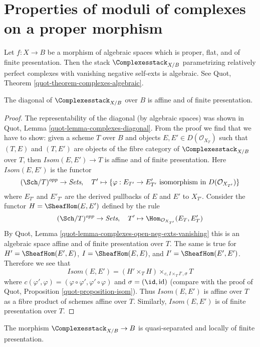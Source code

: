 \section{Properties of moduli of complexes on a proper morphism}
\label{section-complexes}

\noindent
Let $f : X \to B$ be a morphism of algebraic spaces which is proper,
flat, and of finite presentation. Then the stack
$\Complexesstack_{X/B}$ parametrizing relatively perfect complexes
with vanishing negative self-exts is algebraic. See
Quot, Theorem \ref{quot-theorem-complexes-algebraic}.

\begin{lemma}
\label{lemma-complexes-diagonal-affine-fp}
The diagonal of $\Complexesstack_{X/B}$ over $B$ is affine
and of finite presentation.
\end{lemma}

\begin{proof}
The representability of the diagonal (by algebraic spaces)
was shown in Quot, Lemma \ref{quot-lemma-complexes-diagonal}.
From the proof we find that we have to show:
given a scheme $T$ over $B$ and objects
$E, E' \in D(\mathcal{O}_{X_T})$ such that
$(T, E)$ and $(T, E')$ are objects of the fibre category
of $\Complexesstack_{X/B}$ over $T$, then
$\mathit{Isom}(E, E') \to T$
is affine and of finite presentation.
Here $\mathit{Isom}(E, E')$ is the functor
$$
(\Sch/T)^{opp} \to \textit{Sets},\quad
T' \mapsto \{\varphi : E_{T'} \to E'_{T'}
\text{ isomorphism in }D(\mathcal{O}_{X_{T'}})\}
$$
where $E_{T'}$ and $E'_{T'}$ are the derived pullbacks of $E$ and $E'$
to $X_{T'}$. Consider the functor $H = \SheafHom(E, E')$ defined
by the rule
$$
(\Sch/T)^{opp} \to \textit{Sets},\quad
T' \mapsto \Hom_{\mathcal{O}_{X_{T'}}}(E_T, E'_T)
$$
By Quot, Lemma \ref{quot-lemma-complexes-open-neg-exts-vanishing}
this is an algebraic space affine and of finite presentation over $T$.
The same is true for $H' = \SheafHom(E', E)$, $I = \SheafHom(E, E)$, and
$I' = \SheafHom(E', E')$. Therefore we see that
$$
\mathit{Isom}(E, E') = (H' \times_T H) \times_{c, I \times_T I', \sigma} T
$$
where $c(\varphi', \varphi) = (\varphi \circ \varphi', \varphi' \circ \varphi)$
and $\sigma = (\id, \text{id})$ (compare with the proof of
Quot, Proposition \ref{quot-proposition-isom}). Thus
$\mathit{Isom}(E, E')$ is affine over $T$ as a fibre product of
schemes affine over $T$. Similarly, $\mathit{Isom}(E, E')$ is
of finite presentation over $T$.
\end{proof}

\begin{lemma}
\label{lemma-complexes-qs-lfp}
The morphism $\Complexesstack_{X/B} \to B$ is quasi-separated and
locally of finite presentation.
\end{lemma}

